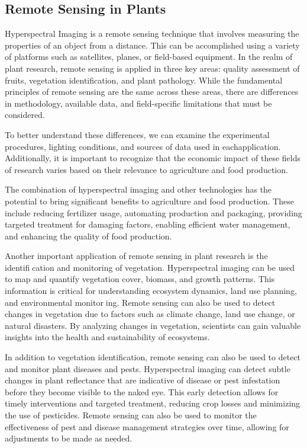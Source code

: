 \documentclass{article}
\begin{document}
{            \subsection{Remote Sensing in Plants}
            \hspace{0.5cm}Hyperspectral Imaging is a remote sensing technique that involves measuring the properties of an object from a distance. This can be accomplished using a variety of platforms such as satellites, planes, or field-based equipment. In the realm of plant research, remote sensing is applied in three key areas: quality assessment of fruits, vegetation identification, and plant pathology. While the fundamental principles of remote sensing are the same across these areas, there are differences in methodology, available data, and field-specific limitations that must be considered.\par
            To better understand these differences, we can examine the experimental procedures, lighting conditions, and sources of data used in eachapplication. Additionally, it is important to recognize that the economic impact of these fields of research varies based on their relevance to agriculture and food production.\par
            The combination of hyperspectral imaging and other technologies has the potential to bring significant benefits to agriculture and food production. These include reducing fertilizer usage, automating production and packaging, providing targeted treatment for damaging factors, enabling efficient water management, and enhancing the quality of food production.\par Another important application of remote sensing in plant research is the identification and monitoring of vegetation. Hyperspectral imaging can be used to map and quantify vegetation cover, biomass, and growth patterns. This information is critical for understanding ecosystem dynamics, land use planning, and environmental monitoring. Remote sensing can also be used to detect changes in vegetation due to factors such as climate change, land use change, or natural disasters. By analyzing changes in vegetation, scientists can gain valuable insights into the health and sustainability of ecosystems.\par
            In addition to vegetation identification, remote sensing can also be used to detect and monitor plant diseases and pests. Hyperspectral imaging can detect subtle changes in plant reflectance that are indicative of disease or pest infestation before they become visible to the naked eye. This early detection allows for timely interventions and targeted treatment, reducing crop losses and minimizing the use of pesticides. Remote sensing can also be used to monitor the effectiveness of pest and disease management strategies over time, allowing for adjustments to be made as needed.\par
}
\end{document}
